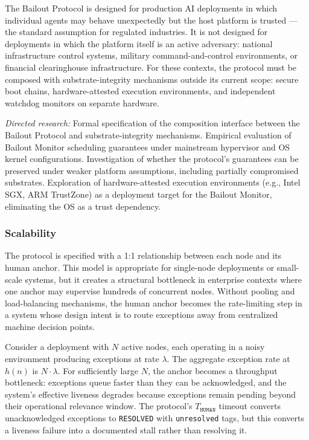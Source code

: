 The Bailout Protocol is designed for production AI deployments in which individual agents may behave unexpectedly but the host platform is trusted --- the standard assumption for regulated industries. It is not designed for deployments in which the platform itself is an active adversary: national infrastructure control systems, military command-and-control environments, or financial clearinghouse infrastructure. For these contexts, the protocol must be composed with substrate-integrity mechanisms outside its current scope: secure boot chains, hardware-attested execution environments, and independent watchdog monitors on separate hardware.

\textit{Directed research:} Formal specification of the composition interface between the Bailout Protocol and substrate-integrity mechanisms. Empirical evaluation of Bailout Monitor scheduling guarantees under mainstream hypervisor and OS kernel configurations. Investigation of whether the protocol's guarantees can be preserved under weaker platform assumptions, including partially compromised substrates. Exploration of hardware-attested execution environments (e.g., Intel SGX, ARM TrustZone) as a deployment target for the Bailout Monitor, eliminating the OS as a trust dependency.

\subsubsection{Scalability}
\label{sec:scalability}

The protocol is specified with a 1:1 relationship between each node and its human anchor. This model is appropriate for single-node deployments or small-scale systems, but it creates a structural bottleneck in enterprise contexts where one anchor may supervise hundreds of concurrent nodes. Without pooling and load-balancing mechanisms, the human anchor becomes the rate-limiting step in a system whose design intent is to route exceptions away from centralized machine decision points.

Consider a deployment with $N$ active nodes, each operating in a noisy environment producing exceptions at rate $\lambda$. The aggregate exception rate at $h(n)$ is $N \cdot \lambda$. For sufficiently large $N$, the anchor becomes a throughput bottleneck: exceptions queue faster than they can be acknowledged, and the system's effective liveness degrades because exceptions remain pending beyond their operational relevance window. The protocol's $T_{\texttt{HUMAN}}$ timeout converts unacknowledged exceptions to \texttt{RESOLVED} with \texttt{unresolved} tags, but this converts a liveness failure into a documented stall rather than resolving it.

